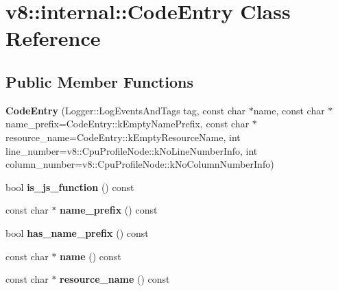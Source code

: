\hypertarget{classv8_1_1internal_1_1_code_entry}{}\section{v8\+:\+:internal\+:\+:Code\+Entry Class Reference}
\label{classv8_1_1internal_1_1_code_entry}
\subsection*{Public Member Functions}
\begin{DoxyCompactItemize}
\item 
\hypertarget{classv8_1_1internal_1_1_code_entry_ad4734c9561d11690fc9d135d0683e2f8}{}{\bfseries Code\+Entry} (Logger\+::\+Log\+Events\+And\+Tags tag, const char $\ast$name, const char $\ast$name\+\_\+prefix=Code\+Entry\+::k\+Empty\+Name\+Prefix, const char $\ast$resource\+\_\+name=Code\+Entry\+::k\+Empty\+Resource\+Name, int line\+\_\+number=v8\+::\+Cpu\+Profile\+Node\+::k\+No\+Line\+Number\+Info, int column\+\_\+number=v8\+::\+Cpu\+Profile\+Node\+::k\+No\+Column\+Number\+Info)\label{classv8_1_1internal_1_1_code_entry_ad4734c9561d11690fc9d135d0683e2f8}

\item 
\hypertarget{classv8_1_1internal_1_1_code_entry_afff2c5d04fd633be4c2e76675dc2f208}{}bool {\bfseries is\+\_\+js\+\_\+function} () const \label{classv8_1_1internal_1_1_code_entry_afff2c5d04fd633be4c2e76675dc2f208}

\item 
\hypertarget{classv8_1_1internal_1_1_code_entry_aeebf1e565b958ea8392e5ca300c363c9}{}const char $\ast$ {\bfseries name\+\_\+prefix} () const \label{classv8_1_1internal_1_1_code_entry_aeebf1e565b958ea8392e5ca300c363c9}

\item 
\hypertarget{classv8_1_1internal_1_1_code_entry_a880727acffb491d0b8ddf0d383b5c1af}{}bool {\bfseries has\+\_\+name\+\_\+prefix} () const \label{classv8_1_1internal_1_1_code_entry_a880727acffb491d0b8ddf0d383b5c1af}

\item 
\hypertarget{classv8_1_1internal_1_1_code_entry_ab1909db2ac67812339659a7334e67306}{}const char $\ast$ {\bfseries name} () const \label{classv8_1_1internal_1_1_code_entry_ab1909db2ac67812339659a7334e67306}

\item 
\hypertarget{classv8_1_1internal_1_1_code_entry_a9f71cda7e74daf7c82dc9211f9a3710b}{}const char $\ast$ {\bfseries resource\+\_\+name} () const \label{classv8_1_1internal_1_1_code_entry_a9f71cda7e74daf7c82dc9211f9a3710b}


\end{DoxyCompactItemize}
